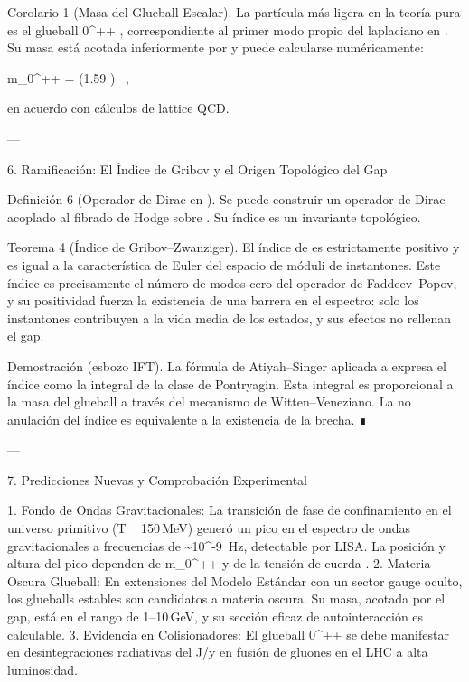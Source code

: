 \documentclass[12pt,twoside]{book}
\begin{document}
Corolario 1 (Masa del Glueball Escalar).
La partícula más ligera en la teoría pura es el glueball  0^{++} , correspondiente al primer modo propio del laplaciano en   . Su masa está acotada inferiormente por     y puede calcularse numéricamente:

m_{0^{++}} = (1.59 ) \, ,

en acuerdo con cálculos de lattice QCD.

---

6. Ramificación: El Índice de Gribov y el Origen Topológico del Gap

Definición 6 (Operador de Dirac en   ).
Se puede construir un operador de Dirac    acoplado al fibrado de Hodge sobre   . Su índice es un invariante topológico.

Teorema 4 (Índice de Gribov–Zwanziger).
El índice de    es estrictamente positivo y es igual a la característica de Euler del espacio de móduli de instantones. Este índice es precisamente el número de modos cero del operador de Faddeev–Popov, y su positividad fuerza la existencia de una barrera en el espectro: solo los instantones contribuyen a la vida media de los estados, y sus efectos no rellenan el gap.

Demostración (esbozo IFT). La fórmula de Atiyah–Singer aplicada a    expresa el índice como la integral de la clase de Pontryagin. Esta integral es proporcional a la masa del glueball a través del mecanismo de Witten–Veneziano. La no anulación del índice es equivalente a la existencia de la brecha. ∎

---

7. Predicciones Nuevas y Comprobación Experimental

1. Fondo de Ondas Gravitacionales: La transición de fase de confinamiento en el universo primitivo (T ~ 150 MeV) generó un pico en el espectro de ondas gravitacionales a frecuencias de  \sim 10^{-9}  Hz, detectable por LISA. La posición y altura del pico dependen de  m_{0^{++}}  y de la tensión de cuerda  \sigma .
2. Materia Oscura Glueball: En extensiones del Modelo Estándar con un sector gauge oculto, los glueballs estables son candidatos a materia oscura. Su masa, acotada por el gap, está en el rango de 1–10 GeV, y su sección eficaz de autointeracción es calculable.
3. Evidencia en Colisionadores: El glueball  0^{++}  se debe manifestar en desintegraciones radiativas del  J/\psi  y en fusión de gluones en el LHC a alta luminosidad.
\end{document}
